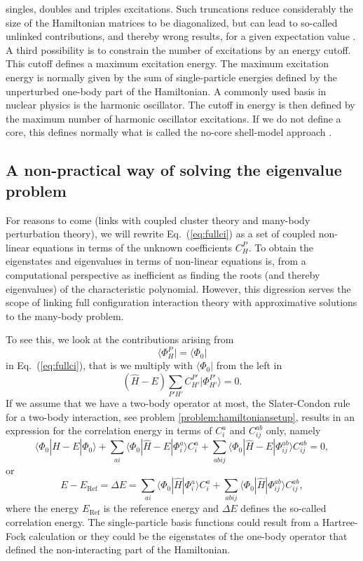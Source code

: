   singles, doubles and triples excitations.  Such truncations reduce
  considerably the size of the Hamiltonian matrices to be
  diagonalized, but can lead to so-called unlinked contributions, and
  thereby wrong results, for a given expectation value
  \cite{barrettmusial2007}.  A third possibility is to constrain the
  number of excitations by an energy cutoff. This cutoff defines a
  maximum excitation energy. The maximum excitation energy is normally given by the 
sum of single-particle energies defined by the unperturbed one-body part of the Hamiltonian.
A commonly used basis in nuclear physics is the harmonic oscillator. The 
cutoff in energy is then defined by the maximum number of harmonic oscillator excitations.
If we do not define a core, this defines normally what is
  called the no-core shell-model approach \cite{navratil2009}.


  \subsection{A non-practical way of solving the eigenvalue problem}

  For reasons to come (links with coupled cluster theory and many-body
  perturbation theory), we will rewrite Eq.~(\ref{eq:fullci}) as a set
  of coupled non-linear equations in terms of the unknown coefficients
  $C_H^P$.  To obtain the eigenstates and eigenvalues in terms of
  non-linear equations is, from a computational perspective as 
  inefficient as finding the roots (and thereby eigenvalues) of the
  characteristic polynomial. However, this digression serves the scope
  of linking full configuration interaction theory with approximative
  solutions to the many-body problem.

  To see this, we look at the contributions arising from
  \[
  \langle \Phi_H^P | = \langle \Phi_0|
  \]
  in Eq.~(\ref{eq:fullci}), that is we multiply with $\langle \Phi_0|$ from the left in
  \[
  (\hat{H} -E)\sum_{P'H'}C_{H'}^{P'}|\Phi_{H'}^{P'} \rangle=0.
  \]
  If we assume that we have a two-body operator at most, the
  Slater-Condon rule for a two-body interaction, see problem
  \ref{problem:hamiltoniansetup}, results in an expression for the
  correlation energy in terms of $C_i^a$ and $C_{ij}^{ab}$ only, namely
  \[
  \langle \Phi_0 | \hat{H} -E| \Phi_0\rangle + \sum_{ai}\langle \Phi_0
  | \hat{H} -E|\Phi_{i}^{a} \rangle C_{i}^{a}+ \sum_{abij}\langle
  \Phi_0 | \hat{H} -E|\Phi_{ij}^{ab} \rangle C_{ij}^{ab}=0,
  \]
  or
  \[
  E-E_{\mathrm{Ref}} =\Delta E=\sum_{ai}\langle \Phi_0 |
  \hat{H}|\Phi_{i}^{a} \rangle C_{i}^{a}+ \sum_{abij}\langle \Phi_0 |
  \hat{H}|\Phi_{ij}^{ab} \rangle C_{ij}^{ab},
  \]
  where the energy $E_{\mathrm{Ref}}$ is the reference energy and
  $\Delta E$ defines the so-called correlation energy.  The
  single-particle basis functions could  result from  a
  Hartree-Fock calculation or they could be the eigenstates of the one-body operator that defined the
  non-interacting part of the Hamiltonian.

